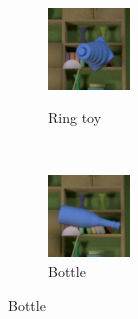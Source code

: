\documentclass{jov}
\begin{document}
\begin{figure}
\begin{subfigure}[b]{0.14 \textwidth}
        \label{fig:libraryWithXylophone}
    \end{subfigure}
    ~
	\begin{subfigure}[b]{0.14 \textwidth}
        \caption{Ring toy}
        \includegraphics[width=\textwidth]{../Figures/Figure4/Figure4_e.png}
        \label{fig:libraryWithRingToy}
    \end{subfigure}
        ~
    	\begin{subfigure}[b]{0.14 \textwidth}
        \caption{Bottle}
        \includegraphics[width=\textwidth]{../Figures/Figure4/Figure4_f.png}

\end{subfigure}
\end{figure}
\end{document}
